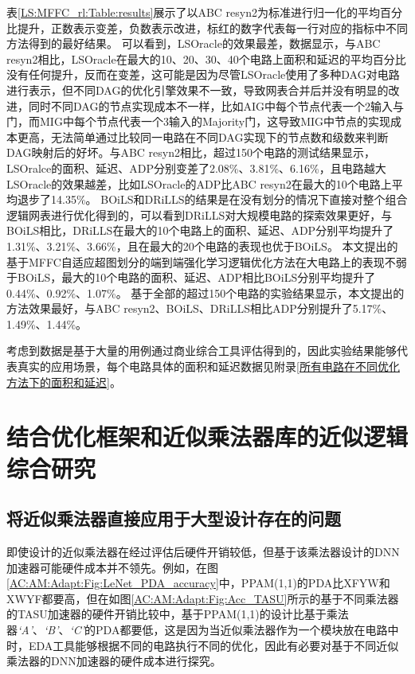 表\ref{LS:MFFC_rl:Table:results}展示了以ABC resyn2为标准进行归一化的平均百分比提升，正数表示变差，负数表示改进，标红的数字代表每一行对应的指标中不同方法得到的最好结果。
可以看到，LSOracle\cite{LS:LSOracle}的效果最差，数据显示，与ABC resyn2相比，LSOracle在最大的10、20、30、40个电路上面积和延迟的平均百分比没有任何提升，反而在变差，这可能是因为尽管LSOracle使用了多种DAG对电路进行表示，但不同DAG的优化引擎效果不一致，导致网表合并后并没有明显的改进，同时不同DAG的节点实现成本不一样，比如AIG中每个节点代表一个2输入与门，而MIG中每个节点代表一个3输入的Majority门，这导致MIG中节点的实现成本更高，无法简单通过比较同一电路在不同DAG实现下的节点数和级数来判断DAG映射后的好坏。与ABC resyn2相比，超过150个电路的测试结果显示，LSOralce的面积、延迟、ADP分别变差了2.08\%、3.81\%、6.16\%，且电路越大LSOracle的效果越差，比如LSOracle的ADP比ABC resyn2在最大的10个电路上平均退步了14.35\%。
BOiLS和DRiLLS的结果是在没有划分的情况下直接对整个组合逻辑网表进行优化得到的，可以看到DRiLLS对大规模电路的探索效果更好，与BOiLS相比，DRiLLS在最大的10个电路上的面积、延迟、ADP分别平均提升了1.31\%、3.21\%、3.66\%，且在最大的20个电路的表现也优于BOiLS。
本文提出的基于MFFC自适应超图划分的端到端强化学习逻辑优化方法在大电路上的表现不弱于BOiLS，最大的10个电路的面积、延迟、ADP相比BOiLS分别平均提升了0.44\%、0.92\%、1.07\%。
基于全部的超过150个电路的实验结果显示，本文提出的方法效果最好，与ABC resyn2、BOiLS、DRiLLS相比ADP分别提升了5.17\%、1.49\%、1.44\%。

考虑到数据是基于大量的用例通过商业综合工具评估得到的，因此实验结果能够代表真实的应用场景，每个电路具体的面积和延迟数据见附录\ref{所有电路在不同优化方法下的面积和延迟}。


\section{结合优化框架和近似乘法器库的近似逻辑综合研究}

\subsection{将近似乘法器直接应用于大型设计存在的问题}

即使设计的近似乘法器在经过评估后硬件开销较低，但基于该乘法器设计的DNN加速器可能硬件成本并不领先。例如，在图\ref{AC:AM:Adapt:Fig:LeNet_PDA_accuracy}中，PPAM(1,1)的PDA比XFYW和XWYF都要高，但在如图\ref{AC:AM:Adapt:Fig:Acc_TASU}所示的基于不同乘法器的TASU加速器的\cite{Accelerator:JiaoLi}硬件开销比较中，基于PPAM(1,1)的设计比基于乘法器\emph{`A'}、\emph{`B'}、\emph{`C'}的PDA都要低，这是因为当近似乘法器作为一个模块放在电路中时，EDA工具能够根据不同的电路执行不同的优化，因此有必要对基于不同近似乘法器的DNN加速器的硬件成本进行探究。

